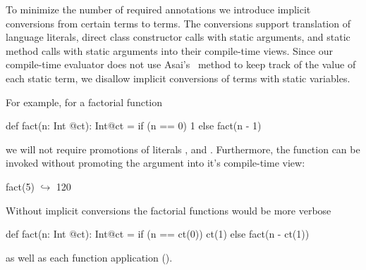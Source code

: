 To minimize the number of required annotations we introduce implicit conversions from certain  terms to  terms.
 The conversions support translation of language literals, direct class constructor calls with static arguments, and static method
 calls with static arguments into their compile-time views. Since our compile-time evaluator does
 not use Asai's~\cite{asai2002binding,sumii2001hybrid} method to keep track of
 the value of each static term, we disallow implicit conversions of terms with static variables.

For example, for a factorial function \begin{lstparagraph}
def fact(n: Int @ct): Int@ct =
  if (n == 0) 1 else fact(n - 1)
 \end{lstparagraph} we will not require promotions of literals , and . Furthermore,
 the function can be invoked without promoting the argument into it's compile-time view:\begin{lstparagraph}
fact(5)
  $\hookrightarrow$ 120
 \end{lstparagraph}

Without implicit conversions the factorial functions would be more verbose \begin{lstparagraph}
def fact(n: Int @ct): Int@ct =
  if (n == ct(0)) ct(1) else fact(n - ct(1))
 \end{lstparagraph} as well as each function application ().

